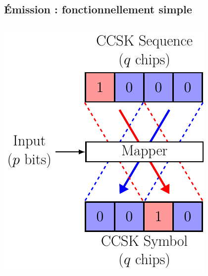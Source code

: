 \documentclass[../main.tex]{subfiles}
\begin{document}
\subsection{Émission : fonctionnellement simple}

\begin{frame}{\subsecname}
  \begin{columns}
    \begin{column}{.35\linewidth}
      \begin{overlayarea}{\linewidth}{.5\textheight}
        \centering
        \includegraphics[width=\linewidth, height=.5\textheight, keepaspectratio = true]{figures/tikzpicture/ccsk_simd_stdl.pdf}
      \end{overlayarea}
    \end{column}
    \begin{column}{.35\linewidth}
      \begin{overlayarea}{\linewidth}{.5\textheight}
        \centering

\end{overlayarea}
\end{column}
\end{columns}
\end{frame}
\end{document}
